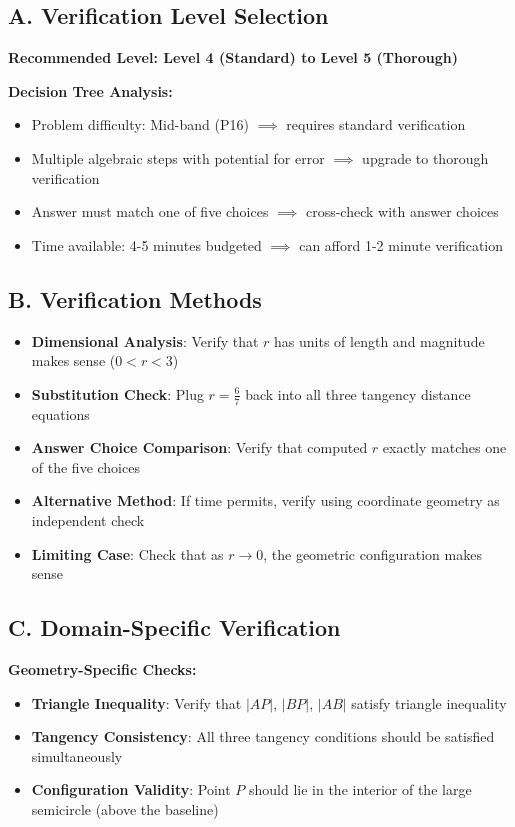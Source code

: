 \documentclass[]{article}
\begin{document}
\begin{verificationbox}
\subsection*{A. Verification Level Selection}

\textbf{Recommended Level: Level 4 (Standard) to Level 5 (Thorough)}

\textbf{Decision Tree Analysis:}
\begin{itemize}[leftmargin=*]
    \item Problem difficulty: Mid-band (P16) $\implies$ requires standard verification
    \item Multiple algebraic steps with potential for error $\implies$ upgrade to thorough verification
    \item Answer must match one of five choices $\implies$ cross-check with answer choices
    \item Time available: 4-5 minutes budgeted $\implies$ can afford 1-2 minute verification
\end{itemize}

\subsection*{B. Verification Methods}
\begin{itemize}[leftmargin=*]
    \item \textbf{Dimensional Analysis}: Verify that $r$ has units of length and magnitude makes sense ($0 < r < 3$)
    \item \textbf{Substitution Check}: Plug $r = \frac{6}{7}$ back into all three tangency distance equations
    \item \textbf{Answer Choice Comparison}: Verify that computed $r$ exactly matches one of the five choices
    \item \textbf{Alternative Method}: If time permits, verify using coordinate geometry as independent check
    \item \textbf{Limiting Case}: Check that as $r \to 0$, the geometric configuration makes sense
\end{itemize}

\subsection*{C. Domain-Specific Verification}
\textbf{Geometry-Specific Checks:}
\begin{itemize}[leftmargin=*]
    \item \textbf{Triangle Inequality}: Verify that $|AP|$, $|BP|$, $|AB|$ satisfy triangle inequality
    \item \textbf{Tangency Consistency}: All three tangency conditions should be satisfied simultaneously
    \item \textbf{Configuration Validity}: Point $P$ should lie in the interior of the large semicircle (above the baseline)
\end{itemize}


\end{verificationbox}
\end{document}
